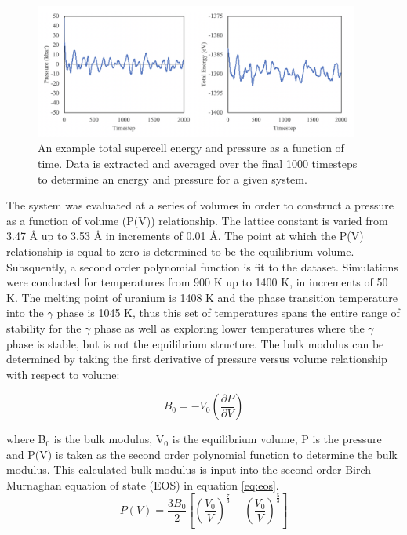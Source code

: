 \documentclass[review]{elsarticle}
\begin{document}
\begin{figure}[h]
 \centering
 \includegraphics[width=0.95\textwidth]{1_convergence.png} 
 \caption{An example total supercell energy and pressure as a function of time. Data is extracted and averaged over the final 1000 timesteps to determine an energy and pressure for a given system. }
 \label{fig:convergence}
\end{figure}

\FloatBarrier

The system was evaluated at a series of volumes in order to construct a pressure as a function of volume (P(V)) relationship. The lattice constant is varied from 3.47 {\AA} up to 3.53 {\AA} in increments of 0.01 {\AA}. The point at which the P(V) relationship is equal to zero is determined to be the equilibrium volume. Subsquently, a second order polynomial function is fit to the dataset. Simulations were conducted for temperatures from 900 K up to 1400 K, in increments of 50 K. The melting point of uranium is 1408 K and the phase transition temperature into the $\gamma$ phase is 1045 K, thus this set of temperatures spans the entire range of stability for the $\gamma$ phase as well as exploring lower temperatures where the $\gamma$ phase is stable, but is not the equilibrium structure. The bulk modulus can be determined by taking the first derivative of pressure versus volume relationship with respect to volume:

\begin{equation}
\label{eq:bulk}
B_{0} = -V_0 \left( \frac{\partial P}{\partial V} \right)
\end{equation}

where B$_0$ is the bulk modulus, V$_0$ is the equilibrium volume, P is the pressure and P(V) is taken as the second order polynomial function to determine the bulk modulus. This calculated bulk modulus is input into the second order Birch-Murnaghan equation of state (EOS) in equation \ref{eq:eos}.
\begin{equation}
\label{eq:eos}
P(V) = \frac{3B_0}{2} \left[ \left(\frac{V_0}{V}\right)^{\frac{7}{3}} - \left(\frac{V_0}{V}\right)^{\frac{5}{3}} \right]
\end{equation}
\end{document}
